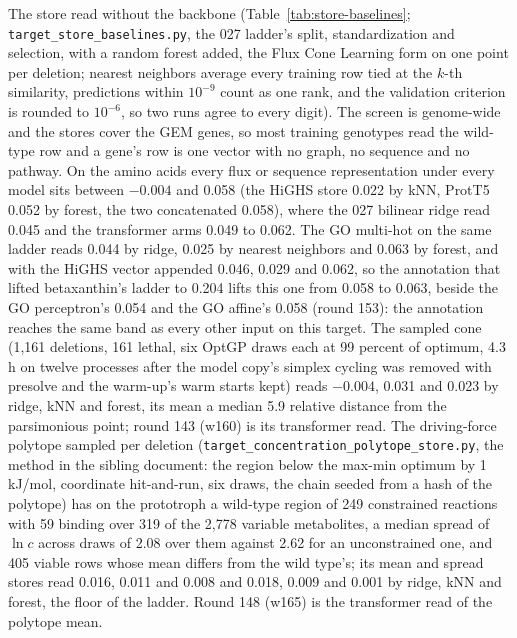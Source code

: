 The store read without the backbone (Table~\ref{tab:store-baselines};
\texttt{target\_store\_baselines.py}, the 027 ladder's split, standardization and
selection, with a random forest added, the Flux Cone Learning form on one point per
deletion; nearest neighbors average every training row tied at the $k$-th similarity,
predictions within $10^{-9}$ count as one rank, and the validation criterion is rounded
to $10^{-6}$, so two runs agree to every digit). The screen is genome-wide and the
stores cover the GEM genes, so most training genotypes read the wild-type row and a
gene's row is one vector with no graph, no sequence and no pathway. On the amino acids
every flux or sequence representation under every model sits between $-0.004$ and
0.058 (the HiGHS store 0.022 by kNN, ProtT5 0.052 by forest, the two concatenated
0.058), where the 027 bilinear ridge read 0.045 and the transformer arms 0.049 to
0.062. The GO multi-hot on the same ladder reads 0.044 by ridge, 0.025 by nearest
neighbors and 0.063 by forest, and with the HiGHS vector appended 0.046, 0.029 and
0.062, so the annotation that lifted betaxanthin's ladder to 0.204 lifts this one from
0.058 to 0.063, beside the GO perceptron's 0.054 and the GO affine's 0.058 (round 153):
the annotation reaches the same band as every other input on this target. The sampled cone
(1,161 deletions, 161 lethal, six OptGP draws each at 99 percent of optimum, 4.3 h on
twelve processes after the model copy's simplex cycling was removed with presolve and
the warm-up's warm starts kept) reads $-0.004$, 0.031 and 0.023 by ridge, kNN and
forest, its mean a median 5.9 relative distance from the parsimonious point; round 143
(w160) is its transformer read. The driving-force
polytope sampled per deletion (\texttt{target\_concentration\_polytope\_store.py}, the
method in the sibling document: the region below the max-min optimum by 1 kJ/mol,
coordinate hit-and-run, six draws, the chain seeded from a hash of the polytope) has on
the prototroph a wild-type region of 249 constrained reactions with 59 binding over 319
of the 2,778 variable metabolites, a median spread of $\ln c$ across draws of 2.08 over
them against 2.62 for an unconstrained one, and 405 viable rows whose mean differs from
the wild type's; its mean and spread stores read 0.016, 0.011 and 0.008 and 0.018,
0.009 and 0.001 by ridge, kNN and forest, the floor of the ladder. Round 148 (w165) is
the transformer read of the polytope mean.


